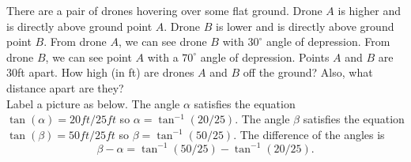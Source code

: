There are a pair of drones hovering over some flat ground. Drone $A$ is higher and is directly above ground point $A$. Drone $B$ is lower and is directly above ground point $B$. From drone $A$, we can see drone $B$ with $30^{\circ}$ angle of depression. From drone $B$, we can see point $A$ with a $70^{\circ}$ angle of depression. Points $A$ and $B$ are $30$ft apart. How high (in ft) are drones $A$ and $B$ off the ground? Also, what distance apart are they?
\[\]
Label a picture as below. The angle $\alpha$ satisfies the equation $\tan(\alpha) = 20ft / 25ft$ so $\alpha = \tan^{-1}(20/25)$. The angle $\beta$ satisfies the equation $\tan(\beta) = 50ft / 25ft$ so $\beta = \tan^{-1}(50/25)$. The difference of the angles is
\[
  \beta - \alpha = \tan^{-1}(50/25) - \tan^{-1}(20/25).
\]
